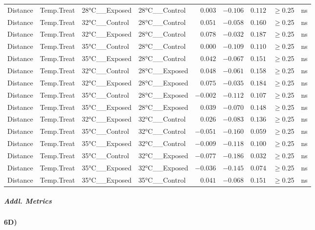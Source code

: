 \documentclass[
]{article}
\begin{document}
\begin{longtable}{llllrrrrl}
\midrule\addlinespace[2.5pt]
Distance & Temp.Treat & 28°C\_\_Exposed & 28°C\_\_Control & $0.003$ & $-0.106$ & $0.112$ & $\geq$0.25 & ns \\ 
Distance & Temp.Treat & 32°C\_\_Control & 28°C\_\_Control & $0.051$ & $-0.058$ & $0.160$ & $\geq$0.25 & ns \\ 
Distance & Temp.Treat & 32°C\_\_Exposed & 28°C\_\_Control & $0.078$ & $-0.032$ & $0.187$ & $\geq$0.25 & ns \\ 
Distance & Temp.Treat & 35°C\_\_Control & 28°C\_\_Control & $0.000$ & $-0.109$ & $0.110$ & $\geq$0.25 & ns \\ 
Distance & Temp.Treat & 35°C\_\_Exposed & 28°C\_\_Control & $0.042$ & $-0.067$ & $0.151$ & $\geq$0.25 & ns \\ 
Distance & Temp.Treat & 32°C\_\_Control & 28°C\_\_Exposed & $0.048$ & $-0.061$ & $0.158$ & $\geq$0.25 & ns \\ 
Distance & Temp.Treat & 32°C\_\_Exposed & 28°C\_\_Exposed & $0.075$ & $-0.035$ & $0.184$ & $\geq$0.25 & ns \\ 
Distance & Temp.Treat & 35°C\_\_Control & 28°C\_\_Exposed & $-0.002$ & $-0.112$ & $0.107$ & $\geq$0.25 & ns \\ 
Distance & Temp.Treat & 35°C\_\_Exposed & 28°C\_\_Exposed & $0.039$ & $-0.070$ & $0.148$ & $\geq$0.25 & ns \\ 
Distance & Temp.Treat & 32°C\_\_Exposed & 32°C\_\_Control & $0.026$ & $-0.083$ & $0.136$ & $\geq$0.25 & ns \\ 
Distance & Temp.Treat & 35°C\_\_Control & 32°C\_\_Control & $-0.051$ & $-0.160$ & $0.059$ & $\geq$0.25 & ns \\ 
Distance & Temp.Treat & 35°C\_\_Exposed & 32°C\_\_Control & $-0.009$ & $-0.118$ & $0.100$ & $\geq$0.25 & ns \\ 
Distance & Temp.Treat & 35°C\_\_Control & 32°C\_\_Exposed & $-0.077$ & $-0.186$ & $0.032$ & $\geq$0.25 & ns \\ 
Distance & Temp.Treat & 35°C\_\_Exposed & 32°C\_\_Exposed & $-0.036$ & $-0.145$ & $0.074$ & $\geq$0.25 & ns \\ 
Distance & Temp.Treat & 35°C\_\_Exposed & 35°C\_\_Control & $0.041$ & $-0.068$ & $0.151$ & $\geq$0.25 & ns \\ 
\bottomrule
\end{longtable}

\subparagraph{Addl. Metrics}\label{addl.-metrics-14}

\paragraph{6D)}\label{d-3}
\end{document}
